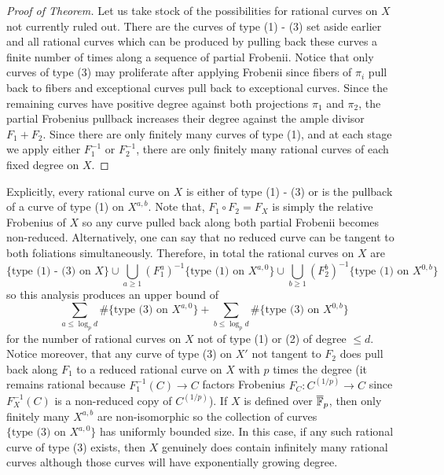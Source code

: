 \documentclass[main.tex]{subfiles}
\begin{document}
\begin{proof}[Proof of Theorem]
\par 
Let us take stock of the possibilities for rational curves on $X$ not currently ruled out. There are the curves of type (1) - (3) set aside earlier and all rational curves which can be produced by pulling back these curves a finite number of times along a sequence of partial Frobenii. Notice that only curves of type (3) may proliferate after applying Frobenii since fibers of $\pi_i$ pull back to fibers and exceptional curves pull back to exceptional curves. Since the remaining curves have positive degree against both projections $\pi_1$ and $\pi_2$, the partial Frobenius pullback increases their degree against the ample divisor $F_1 + F_2$. Since there are only finitely many curves of type (1), and at each stage we apply either $F_1^{-1}$ or $F_2^{-1}$, there are only finitely many rational curves of each fixed degree on $X$. 
\end{proof}

\begin{rmk} \label{rmk:counting}
Explicitly, every rational curve on $X$ is either of type (1) - (3) or is the pullback of a curve of type (1) on $X^{a,b}$. 
Note that, $F_1 \circ F_2 = F_X$ is simply the relative Frobenius of $X$ so any curve pulled back along both partial Frobenii becomes non-reduced. Alternatively, one can say that no reduced curve can be tangent to both foliations simultaneously. Therefore, in total the rational curves on $X$ are 
\[ \{ \text{type (1) - (3) on } X \} \cup \bigcup_{a \ge 1} (F_1^a)^{-1} \{ \text{type (1) on } X^{a,0} \} \cup \bigcup_{b \ge 1} (F_2^b)^{-1} \{ \text{type (1) on } X^{0,b} \} \]
so this analysis produces an upper bound of 
\[ \sum_{a \le \log_p{d}} \# \{ \text{type (3) on } X^{a,0}\} + \sum_{b \le \log_p{d}} \# \{ \text{type (3) on } X^{0,b}\} \]
for the number of rational curves on $X$ not of type (1) or (2) of degree $\le d$. Notice moreover, that any curve of type (3) on $X'$ not tangent to $F_2$ does pull back along $F_1$ to a reduced rational curve on $X$ with $p$ times the degree (it remains rational because $F_1^{-1}(C) \to C$ factors Frobenius $F_C : C^{(1/p)} \to C$ since $F_X^{-1}(C)$ is a non-reduced copy of $C^{(1/p)}$). If $X$ is defined over $\overline{\mathbb{F}}_p$, then only finitely many $X^{a,b}$ are non-isomorphic so the collection of curves $\{ \text{type (3) on } X^{a,0} \}$ has uniformly bounded size. In this case, if any such rational curve of type (3) exists, then $X$ genuinely does contain infinitely many rational curves although those curves will have exponentially growing degree. 
\end{rmk}
\end{document}
